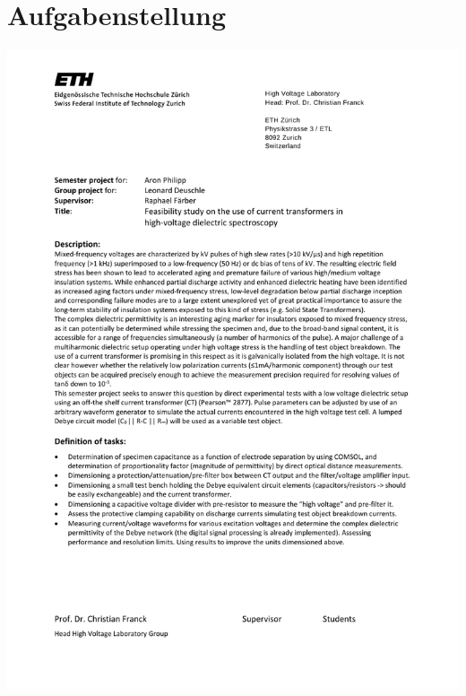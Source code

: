 
\chapter*{Aufgabenstellung}



\includegraphics{figures/Project_Definition_Philipp_Deuschle_HS15.pdf}
